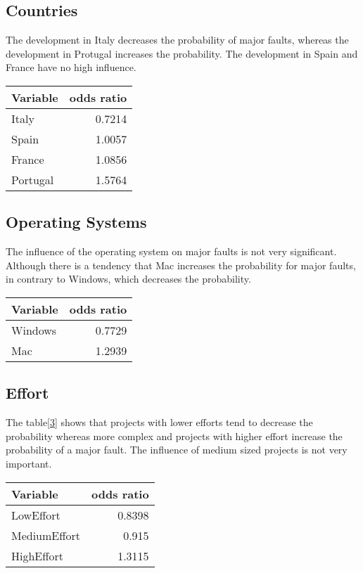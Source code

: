 \subsection{Countries}
The development in Italy decreases the probability of major faults, whereas the development in Protugal increases the probability. The development in Spain and France have no high influence.
\begin{table}[H]
\centering
\begin{tabular}{ | l | r | }
  \hline
	\textbf{Variable} & \textbf{odds ratio} \\ \hline
	Italy & 0.7214 \\ \hline
	Spain & 1.0057 \\ \hline
	France & 1.0856 \\ \hline
	Portugal & 1.5764 \\ \hline
\end{tabular}
\label{table:country}
\end{table}

\subsection{Operating Systems}
The influence of the operating system on major faults is not very significant. Although there is a tendency that Mac increases the probability for major faults, in contrary to Windows, which decreases the probability.
\begin{table}[H]
\centering
\begin{tabular}{ | l | r | }
  \hline
	\textbf{Variable} & \textbf{odds ratio} \\ \hline
	Windows & 0.7729 \\ \hline
	Mac & 1.2939 \\ \hline
\end{tabular}
\label{table:os}
\end{table}

\subsection{Effort}
The table[\ref{table:effort}] shows that projects with lower efforts tend to decrease the probability whereas more complex and projects with higher effort increase the probability of a major fault. The influence of medium sized projects is not very important.
\begin{table}[H]
\centering
\begin{tabular}{ | l | r | }
  \hline
	\textbf{Variable} & \textbf{odds ratio} \\ \hline
	LowEffort & 0.8398 \\ \hline
	MediumEffort & 0.915 \\ \hline
	HighEffort & 1.3115 \\ \hline
\end{tabular}
\label{table:effort}
\end{table}

